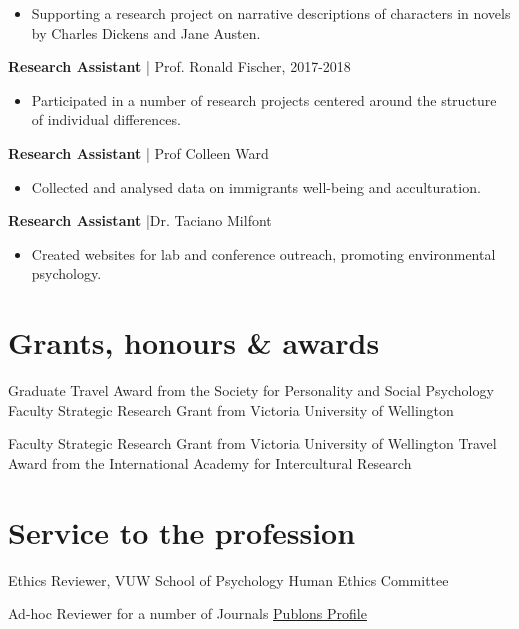 \documentclass[11pt]{article} %
\begin{document}
\begin{itemize}
\item Supporting a research project on narrative descriptions of characters in novels by Charles Dickens and Jane Austen. 
\end{itemize}


\textbf{Research Assistant} | Prof. Ronald Fischer, 2017-2018

\begin{itemize}
\item Participated in a number of research projects centered around the structure of individual differences.
\end{itemize}


\textbf{Research Assistant} | Prof Colleen Ward
\begin{itemize}
\item Collected and analysed data on immigrants well-being and acculturation.
\end{itemize}

\textbf{Research Assistant} |Dr. Taciano Milfont
\begin{itemize}
\item Created websites for lab and conference outreach, promoting environmental psychology.

\end{itemize}

\section*{Grants, honours \& awards}

Graduate Travel Award from the Society for Personality and Social Psychology
Faculty Strategic Research Grant from Victoria University of Wellington

Faculty Strategic Research Grant from Victoria University of Wellington
Travel Award from the International Academy for Intercultural Research\\



\section*{Service to the profession}
Ethics Reviewer, VUW School of Psychology Human Ethics Committee 

Ad-hoc Reviewer for a number of Journals \href{https://publons.com/researcher/1682095/johannes-a-karl/}{Publons Profile}
\end{document}
